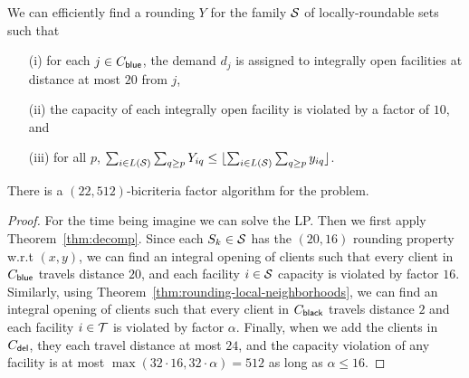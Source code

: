 \begin{lemma} \label{lem:combine-local}
We can efficiently find a rounding $Y$ for the family ${\cal S}$ of locally-roundable sets such that
\begin{enumerate}
\item[(i)] for each $j \in C_{\mathsf{blue}}$, the demand $d_j$ is assigned to integrally open facilities at distance at most $20$ from $j$,
\item[(ii)] the capacity of each integrally open facility is violated by a factor of $10$, and
\item[(iii)] for all $p$, $\sum_{i \in L({\cal S})} \sum_{q \geq p} Y_{iq} \leq \lfloor\sum_{i \in L({\cal S})} \sum_{q \geq p} y_{iq}\rfloor$.
\end{enumerate}
\end{lemma}



\begin{theorem}
	There is a $\left(22,512\right)$-bicriteria factor algorithm for the \mckc problem.
\end{theorem}
\begin{proof}
For the time being imagine we can solve the LP. Then we first apply Theorem~\ref{thm:decomp}.
Since each $S_k \in {\cal S}$ has the $(20,16)$ rounding property w.r.t $(x,y)$, we can find an integral opening of clients
such that every client in $C_{\mathsf{blue}}$ travels distance $20$, and each facility $i\in {\cal S}$ capacity is violated by factor $16$.
Similarly, using Theorem~\ref{thm:rounding-local-neighborhoods}, we can find an integral opening of clients
such that every client in $C_{\mathsf{black}}$ travels distance $2$ and each facility $i\in {\cal T}$ is violated by factor $\alpha$.
Finally, when we add the clients in $C_{\mathsf{del}}$, they each travel distance at most $24$, and the capacity violation of any facility is at most
$\max(32\cdot 16, 32\cdot \alpha) = 512$ as long as $\alpha \leq 16$.
\end{proof}

